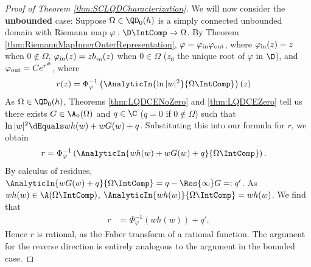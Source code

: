 \documentclass{article}
\numberwithin{equation}{section}
\begin{document}
\begin{proof}[Proof of Theorem \ref{thm:SCLQDCharacterization}]
We will now consider the {\bf unbounded} case: Suppose $\Omega\in\QD_0(h)$ is a simply connected unbounded domain with Riemann map $\varphi:\D\IntComp\rightarrow\Omega$. By Theorem \ref{thm:RiemannMapInnerOuterRepresentation}, $\varphi=\varphi_{\rm in}\varphi_{\rm out}$, where $\varphi_{\rm in}(z)=z$ when $0\notin\Omega$, $\varphi_{\rm in}(z)=zb_{z_0}(z)$ when $0\in\Omega$ ($z_0$ the unique root of $\varphi$ in $\D$), and $\varphi_{\rm out}=Ce^{r^{\#}}$, where
\begin{align*}
r(z)&=\Phi_{\varphi}^{-1}\left(\AnalyticIn{\ln|w|^2}{\Omega\IntComp}\right)(z)
\end{align*}
As $\Omega\in\QD_0(h)$, Theorems \ref{thm:LQDCENoZero} and \ref{thm:LQDCEZero} tell us there exists $G\in\A_0(\Omega)$ and $q\in\C$ ($q=0$ if $0\notin\Omega$) such that $\ln|w|^2\dEquals wh(w)+wG(w)+q$. Substituting this into our formula for $r$, we obtain
\begin{align*}
r&=\Phi_{\varphi}^{-1}\left(\AnalyticIn{wh(w)+wG(w)+q}{\Omega\IntComp}\right).
\end{align*}
By calculus of residues, $\AnalyticIn{wG(w)+q}{\Omega\IntComp}=q-\Res{\infty}G=:q'$. As $wh(w)\in\A(\Omega\IntComp)$, $\AnalyticIn{wh(w)}{\Omega\IntComp}=wh(w)$. We find that
\begin{align*}
r&=\Phi_{\varphi}^{-1}\left(wh(w)\right)+q'.
\end{align*}
Hence $r$ is rational, as the Faber transform of a rational function. The argument for the reverse direction is entirely analogous to the argument in the bounded case. 
\end{proof}
\end{document}

